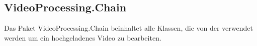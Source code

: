 \subsection{VideoProcessing.Chain} \label{service:modul:VideoProcessingChain}
Das Paket VideoProcessing.Chain beinhaltet alle Klassen, die von der  verwendet werden um ein hochgeladenes Video zu bearbeiten.